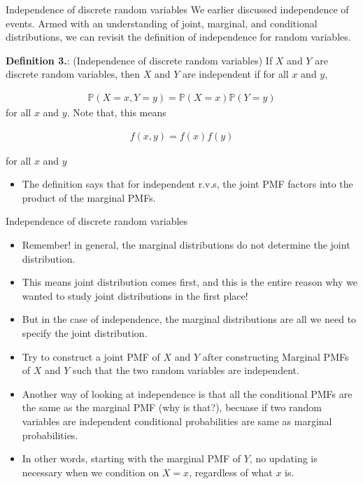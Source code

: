 \documentclass[8pt, usepdftitle = false]{beamer}
\newcounter{mytheorem}
\renewcommand{\themytheorem}{3.\arabic{mytheorem}}
\newcommand{\Thm}[1]{\refstepcounter{mytheorem}\textbf{#1\color{blue}\themytheorem}:}
\begin{document}
\begin{frame}{Independence of discrete random variables}
We earlier discussed independence of events. Armed with an understanding of joint, marginal, and conditional distributions, we can revisit the definition of independence for random variables.


\begin{varblock}{\Thm{Definition } (Independence of discrete random variables)}
If $X$ and $Y$ are discrete random variables, then $X$ and $Y$ are \alert{independent} if for all $x$ and $y$,


\begin{align*}
\mathbb{P}(X=x, Y=y)=\mathbb{P}(X=x) \mathbb{P}(Y=y)
\end{align*}
for all $x$ and $y$. Note that, this means


\begin{align*}
f(x,y)=f(x) f(y)
\end{align*}

for all $x$ and $y$

\end{varblock}

\begin{itemize}


   \item The definition says that for independent r.v.s, the joint PMF factors into the product of the marginal PMFs. 

 \end{itemize} 

\end{frame}


\begin{frame}{Independence of discrete random variables}

\begin{itemize}
   \item Remember! in general, the marginal distributions do not determine the joint distribution.

   \item This means joint distribution comes first, and this is the entire reason why we wanted to study joint distributions in the first place! 

   \item But in the case of independence, the marginal distributions are all we need to specify the joint distribution.

   \item Try to construct a joint PMF of $X$ and $Y$ after constructing Marginal PMFs of $X$ and $Y$ such that the two random variables are independent. 

   \item Another way of looking at independence is that all the conditional PMFs are the same as the marginal PMF (why is that?), becuase if two random variables are independent conditional probabilities are same as marginal probabilities.

   \item In other words, starting with the marginal PMF of $Y$, no updating is necessary when we condition on $X=x$, regardless of what $x$ is. 
 \end{itemize} 

\end{frame}
\end{document}
